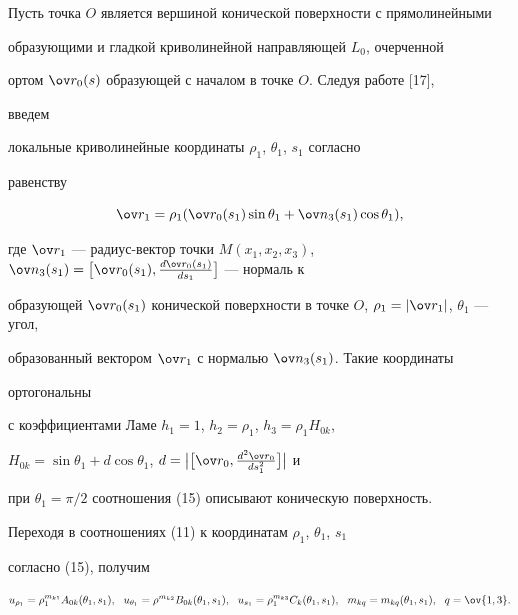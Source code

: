  


Пусть точка $O$ является вершиной конической поверхности с прямолинейными  


образующими и гладкой криволинейной направляющей $L_0$, очерченной  


ортом $\ov r_0(s)$ образующей с началом в точке $O$. Следуя работе [17], 


введем  


локальные криволинейные координаты $\rho_1$, $\theta_1$, $s_1$ согласно 


равенству 


\begin{equation} 


\ov r_1=\rho_1(\ov r_0(s_1)\sin\theta_1+\ov n_3(s_1)\cos\theta_1), 


\end{equation} 


где $\ov r_1$ --- радиус-вектор точки $M(x_1,x_2,x_3)$, $\ov n_3(s_1)= \big[\ov 


r_0(s_1),\frac{d\ov r_0(s_1)}{ds_1}\big]$ --- нормаль к  


образующей $\ov r_0(s_1)$ конической поверхности в точке $O$, $\rho_1=|\ov 


r_1|$, $\theta_1$ --- угол,  


образованный вектором $\ov r_1$ с нормалью $\ov n_3(s_1)$. Такие координаты 


ортогональны  


с коэффициентами Ламе $h_1=1$, $h_2=\rho_1$, $h_3=\rho_1H_{0k}$, 


$H_{0k}=\sin\theta_1+d\cos\theta_1$, $d=\big|\big[\ov r_0, \frac{d^2\ov 


r_0}{ds^2_1}\big]\big|$ и  


при $\theta_1=\pi/2$ соотношения (15) описывают коническую поверхность. 


Переходя в соотношениях (11) к координатам $\rho_1$, $\theta_1$, $s_1$ 


согласно (15), получим 


\begin{equation} 


u_{\rho_1}=\rho^{m_{k1}}_1A_{0k}(\theta_1,s_1), 


\ \ u_{\theta_1}=\rho^{m_{k2}}B_{0k}(\theta_1,s_1), 


\ \ u_{s_1}=\rho^{m_{k3}}_1C_{k}(\theta_1,s_1), 


\ \ m_{kq}=m_{kq}(\theta_1,s_1),\ \ q=\ov{1,3}. 


\end{equation} 


